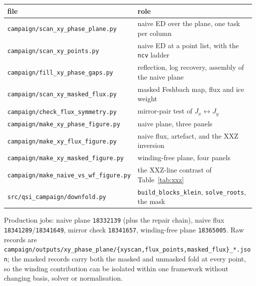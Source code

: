 \documentclass[11pt]{article}
\begin{document}
\begin{table}[h]
\centering
\small
\begin{tabular}{ll}
\toprule
file & role\\
\midrule
\texttt{campaign/scan\_xy\_phase\_plane.py} & naive ED over the plane, one task per column\\
\texttt{campaign/scan\_xy\_points.py} & naive ED at a point list, with the \texttt{ncv} ladder\\
\texttt{campaign/fill\_xy\_phase\_gaps.py} & reflection, log recovery, assembly of the naive plane\\
\texttt{campaign/scan\_xy\_masked\_flux.py} & masked Feshbach map, flux and ice weight\\
\texttt{campaign/check\_flux\_symmetry.py} & mirror-pair test of $J_x\leftrightarrow J_y$\\
\texttt{campaign/make\_xy\_phase\_figure.py} & naive plane, three panels\\
\texttt{campaign/make\_xy\_flux\_figure.py} & naive flux, artefact, and the XXZ inversion\\
\texttt{campaign/make\_xy\_masked\_figure.py} & winding-free plane, four panels\\
\texttt{campaign/make\_naive\_vs\_wf\_figure.py} & the XXZ-line contrast of Table~\ref{tab:xxz}\\
\texttt{src/qsi\_campaign/downfold.py} & \texttt{build\_blocks\_klein}, \texttt{solve\_roots}, the mask\\
\bottomrule
\end{tabular}
\end{table}

\noindent
Production jobs: naive plane \texttt{18332139} (plus the repair chain),
naive flux \texttt{18341289}/\texttt{18341649}, mirror check
\texttt{18341657}, winding-free plane \texttt{18365005}.  Raw records are
\texttt{campaign/outputs/xy\_phase\_plane/\{xyscan,flux\_points,masked\_flux\}\_*.json};
the masked records carry both the masked and unmasked fold at every point,
so the winding contribution can be isolated within one framework without
changing basis, solver or normalisation.
\end{document}

